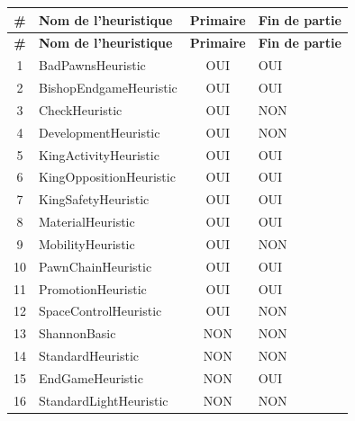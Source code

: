 \documentclass{article}
\begin{document}
\begin{longtable}{|c|p{5cm}|c|p{5cm}|}
    \hline
    \textbf{\#} & \textbf{Nom de l'heuristique} & \textbf{Primaire} & \textbf{Fin de partie} \\
    \hline
    \endfirsthead

    \hline
    \textbf{\#} & \textbf{Nom de l'heuristique} & \textbf{Primaire} & \textbf{Fin de partie} \\
    \hline
    \endhead

    \hline
    1 & BadPawnsHeuristic & OUI & OUI \\
    \hline
    2 & BishopEndgameHeuristic & OUI & OUI \\
    \hline
    3 & CheckHeuristic & OUI & NON \\
    \hline
    4 & DevelopmentHeuristic & OUI & NON \\
    \hline
    5 & KingActivityHeuristic & OUI & OUI \\
    \hline
    6 & KingOppositionHeuristic & OUI & OUI \\
    \hline
    7 & KingSafetyHeuristic & OUI & OUI \\
    \hline
    8 & MaterialHeuristic & OUI & OUI \\
    \hline
    9 & MobilityHeuristic & OUI & NON \\
    \hline
    10 & PawnChainHeuristic & OUI & OUI \\
    \hline
    11 & PromotionHeuristic & OUI & OUI \\
    \hline
    12 & SpaceControlHeuristic & OUI & NON \\
    \hline
    13 & ShannonBasic & NON & NON \\
    \hline
    14 & StandardHeuristic & NON & NON \\
    \hline
    15 & EndGameHeuristic & NON & OUI \\
    \hline
    16 & StandardLightHeuristic & NON & NON \\
    \hline
\end{longtable}
\end{document}
